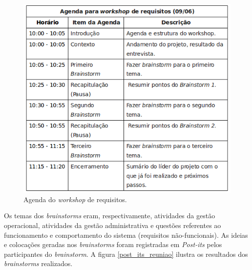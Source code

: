       \begin{figure}[!htbp]
	\centering
	\includegraphics[scale=0.5]{figuras/agenda_workshop}
	\caption[\textit{Agenda do \textit{workshop} de requisitos} do projeto]{Agenda do \textit{workshop} de requisitos.}
	\label{agenda_workshop}
      \end{figure}
      
      Os temas dos \textit{brainstorms} eram, respectivamente, atividades da gestão operacional, atividades da gestão administrativa
      e questões referentes ao funcionamento e comportamento do sistema (requisitos não-funcionais). As ideias e colocações 
      geradas nos \textit{brainstorms} foram registradas em \textit{Post-its} pelos participantes do \textit{brainstorm}. 
      A figura \ref{post_its_reuniao} ilustra os resultados dos \textit{brainstorms} realizados.
      
